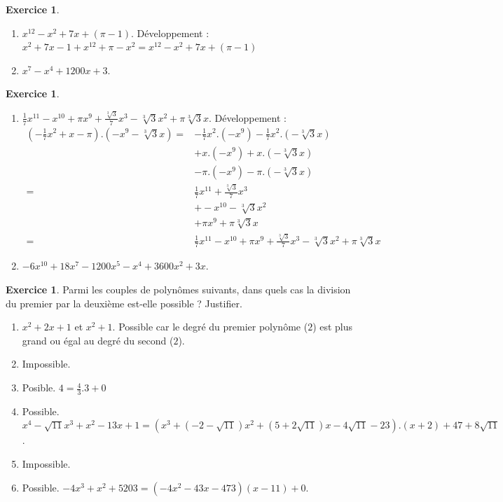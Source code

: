 \documentclass[a4paper,13pt]{scrreprt}
\theoremstyle{plain}
\theoremstyle{definition}
\newtheorem{exo}[subsection]{Exercice}
\begin{document}
\begin{exo}  ~~\\ \begin{enumerate}
		\item $x^{12} - x^2 + 7x + (\pi -1)$. Développement : \\
		$x^2+7x-1 + x^{12} + \pi -x^2 = x^{12} - x^2 + 7x + (\pi -1)$
		\item $x^7 - x^4 +1200x+3$.
	\end{enumerate}
\end{exo}
\newpage
\begin{exo}  ~~\\ \begin{enumerate}
		\item $\frac{1}{7}x^{11} -x^{10} + \pi x^{9} +\frac{\sqrt[3]{3}}{7}x^3 -\sqrt[3]{3}x^2 + \pi \sqrt[3]{3} x$. Développement :
		\begin{align*}
		(-\frac{1}{7}x^2+x-\pi).(-x^{9} -\sqrt[3]{3}x) =& -\frac{1}{7}x^2.(-x^{9}) -\frac{1}{7}x^2.(-\sqrt[3]{3}x) \\
		&+ x.(-x^{9}) + x.(-\sqrt[3]{3}x) \\
		&-\pi.(-x^{9}) -\pi.(-\sqrt[3]{3}x) \\
		=&\frac{1}{7}x^{11} +\frac{\sqrt[3]{3}}{7}x^3 \\
		&+ -x^{10} -\sqrt[3]{3}x^2 \\
		&+\pi x^{9} + \pi \sqrt[3]{3} x \\
		=&\frac{1}{7}x^{11} -x^{10} + \pi x^{9} +\frac{\sqrt[3]{3}}{7}x^3 -\sqrt[3]{3}x^2 + \pi \sqrt[3]{3} x
		\end{align*}
		\item $-6 x^{10} + 18 x^7 - 1200 x^5 - x^4 + 3600 x^2 + 3 x$.
	\end{enumerate}
\end{exo}

\begin{exo}
	Parmi les couples de polynômes suivants, dans quels cas la division du premier par la deuxième est-elle possible ? Justifier.
	\begin{enumerate}
		\item $x^2+2x+1$ et $x^{2} +1$. Possible car le degré du premier polynôme ($2$) est plus grand ou égal au degré du second ($2$).
		\item Impossible.
		\item Posible. $4 = \frac{4}{3}.3 + 0$
		\item Possible. $x^4 - \sqrt{11} x^3 + x^2 - 13 x + 1 = (x^3 + (-2 - \sqrt{11}) x^2 + (5 + 2 \sqrt{11}) x - 4 \sqrt{11} - 23). (x + 2) + 47 + 8 \sqrt{11}$.
		\item Impossible.
		\item Possible. $-4x^3 +x^2 +5203 = (-4 x^2 - 43 x - 473)(x-11)+0$.
	\end{enumerate}
\end{exo}
\end{document}
